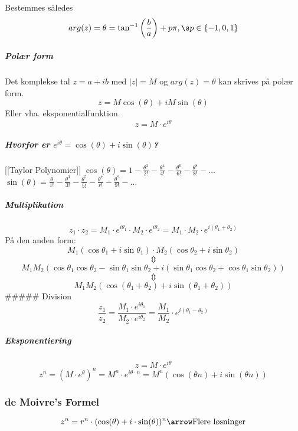 Bestemmes således
\[arg(z)= \theta =\tan^{-1}\left(\frac{b}{a}\right) + p\pi, \s p \in \{-1,0,1\}\]

\hypertarget{poluxe6r-form-1}{%
\subparagraph{Polær form}\label{poluxe6r-form-1}}

Det komplekse tal \(z = a+ib\) med \(|z| = M\) og \(arg(z) = \theta\)
kan skrives på polær form. \[z=M\cos(\theta) + iM\sin(\theta)\] Eller
vha. eksponentialfunktion. \[z=M \cdot e^{i\theta}\]

\hypertarget{hvorfor-er-eitheta-costheta-isintheta}{%
\subparagraph{\texorpdfstring{Hvorfor er
\(e^{i\theta} = \cos(\theta) + i\sin(\theta)\)?}{Hvorfor er e\^{}\{i\textbackslash theta\} = \textbackslash cos(\textbackslash theta) + i\textbackslash sin(\textbackslash theta)?}}\label{hvorfor-er-eitheta-costheta-isintheta}}

{[}{[}Taylor Polynomier{]}{]}
\(\cos(\theta) = 1- \frac{\theta^2}{2!}-\frac{\theta^4}{4!}-\frac{\theta^6}{6!}-\frac{\theta^8}{8!}-\dots\)
\(\sin(\theta) = \frac{\theta}{1!} - \frac{\theta^3}{3!}-\frac{\theta^5}{5!}-\frac{\theta^7}{r!}-\frac{\theta^9}{9!}-\dots\)

\hypertarget{multiplikation-1}{%
\subparagraph{Multiplikation}\label{multiplikation-1}}

\[z_1 \cdot z_2 = M_1 \cdot  e^{i\theta_1} \cdot  M_2 \cdot  e^{i\theta_2} = M_1 \cdot  M_2 \cdot  e^{i(\theta_1 + \theta_2)}\]
På den anden form:
\[M_1(\cos\theta_1 + i\sin\theta_1) \cdot M_2(\cos\theta_2 + i \sin\theta_2)\]
\[\Updownarrow\]
\[M_1M_2(\cos\theta_1 \cos\theta_2 - \sin \theta_1 \sin\theta_2 + i(\sin\theta_1\cos\theta_2 + \cos\theta_1\sin\theta_2))\]
\[\Updownarrow\]
\[M_1M_2(\cos(\theta_1 + \theta_2)+i \sin(\theta_1 + \theta_2))\]
\#\#\#\#\# Division
\[\frac{z_1}{z_2} = \frac{M_1 \cdot e^{i\theta_1}}{M_2 \cdot e^{i\theta_2}} = \frac{M_1}{M_2} \cdot e^{i(\theta_1-\theta_2)}\]

\hypertarget{eksponentiering}{%
\subparagraph{Eksponentiering}\label{eksponentiering}}

\[z=M \cdot e^{i\theta}\]
\[z^n = (M \cdot e^\theta)^n = M^n \cdot e^{i\theta \cdot n} = M^n (\cos(\theta n) + i\sin(\theta n))\]

\hypertarget{de-moivres-formel}{%
\subsubsection{de Moivre's Formel}\label{de-moivres-formel}}

\[z^n = r^n \cdot (\cos(\theta) + i \cdot \sin(\theta))^n \arrow \text{Flere løsninger}\]

